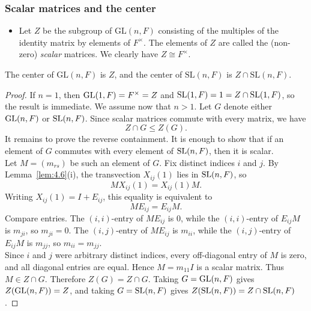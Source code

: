 \documentclass[../Odyssey_Project.tex]{subfiles}
\begin{document}
\subsubsection*{Scalar matrices and the center}
\begin{itemize}
    \item Let $Z$ be the subgroup of $\mathrm{GL}(n,F)$ consisting of the multiples of the identity matrix by elements of $F^{\times}$. The elements of $Z$ are called the (non-zero) \emph{scalar} matrices. We clearly have $Z \cong F^{\times}$.
\end{itemize}

\begin{proposition}
\label{prop:6.4}
The center of $\mathrm{GL}(n,F)$ is $Z$, and the center of $\mathrm{SL}(n,F)$ is $Z \cap \mathrm{SL}(n,F)$.
\end{proposition}
\begin{proof}
If $n=1$, then $\operatorname{GL}(1,F)=F^\times=Z$ and $\operatorname{SL}(1,F)=1=Z\cap \operatorname{SL}(1,F)$, so the result is immediate. We assume now that $n>1$. Let $G$ denote either $\operatorname{GL}(n,F)$ or $\operatorname{SL}(n,F)$. Since scalar matrices commute with every matrix, we have
\[
    Z\cap G\leq Z(G).
\]
It remains to prove the reverse containment. It is enough to show that if an element of $G$ commutes with every element of $\operatorname{SL}(n,F)$, then it is scalar.\\
Let $M=(m_{rs})$ be such an element of $G$. Fix distinct indices $i$ and $j$. By Lemma~\ref{lem:4.6}(i), the transvection $X_{ij}(1)$ lies in $\operatorname{SL}(n,F)$, so
\[
    MX_{ij}(1)=X_{ij}(1)M.
\]
Writing $X_{ij}(1)=I+E_{ij}$, this equality is equivalent to
\[
    ME_{ij}=E_{ij}M.
\]
Compare entries. The $(i,i)$-entry of $ME_{ij}$ is $0$, while the $(i,i)$-entry of $E_{ij}M$ is $m_{ji}$, so $m_{ji}=0$. The $(i,j)$-entry of $ME_{ij}$ is $m_{ii}$, while the $(i,j)$-entry of $E_{ij}M$ is $m_{jj}$, so $m_{ii}=m_{jj}$.\\
Since $i$ and $j$ were arbitrary distinct indices, every off-diagonal entry of $M$ is zero, and all diagonal entries are equal. Hence $M=m_{11}I$ is a scalar matrix. Thus $M\in Z\cap G$. Therefore $Z(G)=Z\cap G$. Taking $G=\operatorname{GL}(n,F)$ gives $Z(\operatorname{GL}(n,F))=Z$, and taking $G=\operatorname{SL}(n,F)$ gives $Z(\operatorname{SL}(n,F))=Z\cap \operatorname{SL}(n,F)$.
\end{proof}
\end{document}
